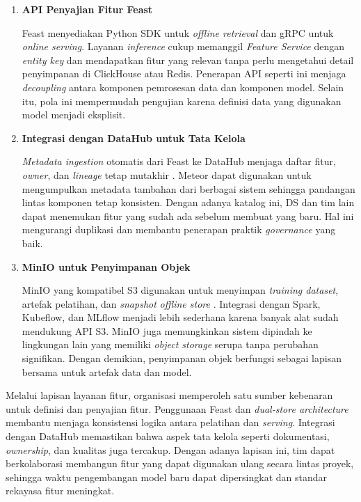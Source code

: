 \begin{enumerate}
    \vspace{0.5em}

    \item \textbf{API Penyajian Fitur Feast}  

    Feast menyediakan Python SDK untuk \textit{offline retrieval} dan gRPC untuk \textit{online serving}. Layanan \textit{inference} cukup memanggil \textit{Feature Service} dengan \textit{entity key} dan mendapatkan fitur yang relevan tanpa perlu mengetahui detail penyimpanan di ClickHouse atau Redis. Penerapan API seperti ini menjaga \textit{decoupling} antara komponen pemrosesan data dan komponen model. Selain itu, pola ini mempermudah pengujian karena definisi data yang digunakan model menjadi eksplisit.

    \vspace{0.5em}

    \item \textbf{Integrasi dengan DataHub untuk Tata Kelola}  

    \textit{Metadata ingestion} otomatis dari Feast ke DataHub menjaga daftar fitur, \textit{owner}, dan \textit{lineage} tetap mutakhir \autocite{datahub2024,lamer2024data}. Meteor dapat digunakan untuk mengumpulkan metadata tambahan dari berbagai sistem sehingga pandangan lintas komponen tetap konsisten. Dengan adanya katalog ini, DS dan tim lain dapat menemukan fitur yang sudah ada sebelum membuat yang baru. Hal ini mengurangi duplikasi dan membantu penerapan praktik \textit{governance} yang baik.

    \vspace{0.5em}

    \item \textbf{MinIO untuk Penyimpanan Objek}  

    MinIO yang kompatibel S3 digunakan untuk menyimpan \textit{training dataset}, artefak pelatihan, dan \textit{snapshot} \textit{offline store} \autocite{minio2024}. Integrasi dengan Spark, Kubeflow, dan MLflow menjadi lebih sederhana karena banyak alat sudah mendukung API S3. MinIO juga memungkinkan sistem dipindah ke lingkungan lain yang memiliki \textit{object storage} serupa tanpa perubahan signifikan. Dengan demikian, penyimpanan objek berfungsi sebagai lapisan bersama untuk artefak data dan model.

    \vspace{0.5em}
\end{enumerate}

Melalui lapisan layanan fitur, organisasi memperoleh satu sumber kebenaran untuk definisi dan penyajian fitur. Penggunaan Feast dan \textit{dual-store architecture} membantu menjaga konsistensi logika antara pelatihan dan \textit{serving}. Integrasi dengan DataHub memastikan bahwa aspek tata kelola seperti dokumentasi, \textit{ownership}, dan kualitas juga tercakup. Dengan adanya lapisan ini, tim dapat berkolaborasi membangun fitur yang dapat digunakan ulang secara lintas proyek, sehingga waktu pengembangan model baru dapat dipersingkat dan standar rekayasa fitur meningkat.

